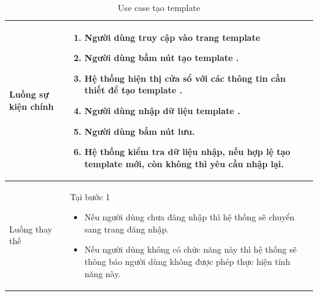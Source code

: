 \documentclass[12pt,a4paper]{article}
\begin{document}
\begin{table}[H]
\begin{tabular}{|p{3.5cm}|p{11.5cm}|c|}
            Luồng sự kiện chính & \vspace{-.8cm}\begin{enumerate}
                                                    \item Người dùng truy cập vào trang template
                                                    \item  Người dùng bấm nút tạo template .
                                                    \item  Hệ thống hiện thị cửa sổ với các thông tin cần thiết để tạo template .
                                                    \item  Người dùng nhập dữ liệu template .
                                                    \item Người dùng bấm nút lưu.
                                                    \item Hệ thống kiểm tra dữ liệu nhập, nếu hợp lệ tạo template mới, còn không thì yêu cầu nhập lại.
            \end{enumerate}
            \\
            \hline
            Luồng thay thế & Tại bước 1\newline
            \vspace{-.8cm}\begin{itemize}
                              \item Nếu người dùng chưa đăng nhập thì hệ thống sẽ chuyển sang trang đăng nhập.
                              \item  Nếu người dùng không có chức năng này thì hệ thống sẽ thông báo người dùng không được phép thực hiện tính năng này.
            \end{itemize}
            \\
            \hline
        \end{tabular}
        \caption{Use case tạo template }
    \end{table}


\end{document}
